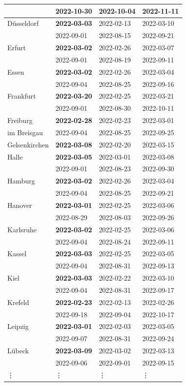 \documentclass[11pt]{article}
\begin{document}
\begin{table}[htbp]
{\begin{tabular}{llll}
            & 2022-10-30 & 2022-10-04 & 2022-11-11\\ \hline
Düsseldorf  & \textbf{2022-03-03} & 2022-02-13 & 2022-03-10\\
            & 2022-09-01 & 2022-08-15 & 2022-09-21\\ \hline
Erfurt      & \textbf{2022-03-02} & 2022-02-26 & 2022-03-07\\
            & 2022-09-01 & 2022-08-19 & 2022-09-11\\ \hline
Essen       & \textbf{2022-03-02} & 2022-02-26 & 2022-03-04\\
            & 2022-09-04 & 2022-08-25 & 2022-09-16\\ \hline
Frankfurt   & \textbf{2022-03-20} & 2022-02-25 & 2022-03-21\\
            & 2022-09-01 & 2022-08-30 & 2022-10-11\\ \hline
Freiburg & \textbf{2022-02-28} & 2022-02-23 & 2022-03-01\\
im Breisgau & 2022-09-04 & 2022-08-25 & 2022-09-25\\ \hline
Gelsenkirchen & \textbf{2022-03-08} & 2022-02-20 & 2022-03-15\\ \hline
Halle       & \textbf{2022-03-05} & 2022-03-01 & 2022-03-08\\
            & 2022-09-01 & 2022-08-23 & 2022-09-30\\ \hline
Hamburg     & \textbf{2022-03-02} & 2022-02-26 & 2022-03-04\\
            & 2022-09-04 & 2022-08-25 & 2022-09-21\\ \hline
Hanover     & \textbf{2022-03-01} & 2022-02-25 & 2022-03-06\\
            & 2022-08-29 & 2022-08-03 & 2022-09-26\\ \hline
Karlsruhe   & \textbf{2022-03-02} & 2022-02-25 & 2022-03-06\\
            & 2022-09-04 & 2022-08-24 & 2022-09-11\\ \hline
Kassel      & \textbf{2022-03-03} & 2022-02-25 & 2022-03-05\\
            & 2022-09-04 & 2022-08-31 & 2022-09-13\\ \hline
Kiel        & \textbf{2022-03-03} & 2022-02-22 & 2022-03-10\\
            & 2022-09-04 & 2022-08-31 & 2022-09-17\\ \hline
Krefeld     & \textbf{2022-02-23} & 2022-02-13 & 2022-02-26\\
            & 2022-09-18 & 2022-09-04 & 2022-10-17\\ \hline
Leipzig     & \textbf{2022-03-01} & 2022-02-03 & 2022-03-05\\
            & 2022-09-07 & 2022-08-31 & 2022-09-24\\ \hline
Lübeck      & \textbf{2022-03-09} & 2022-03-02 & 2022-03-13\\
            & 2022-09-06 & 2022-09-01 & 2022-09-15\\ \hline
\vdots      & \vdots     & \vdots     & \vdots      \\ \hline
\end{tabular}
}
\end{table}
\end{document}
